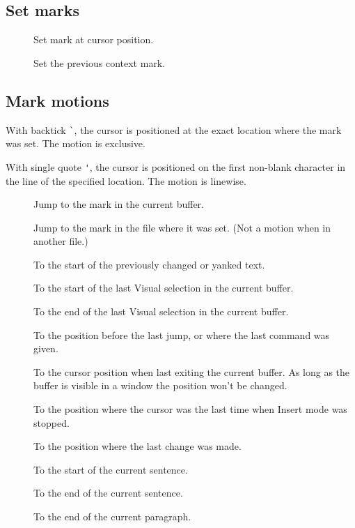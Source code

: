 \documentclass{article}
\newcommand{\syntax}[1]{\PVerb{#1}}
\begin{document}
\subsection{Set marks}
\begin{description}
  \item[\syntax{m{a-zA-Z}}] Set mark at cursor position. 
  \item[\syntax{m', m`}] Set the previous context mark.
\end{description}
\subsection{Mark motions}
    With backtick \verb|`|, the cursor is positioned at the exact location where the mark was set. The motion is exclusive.

    With single quote \verb|'|, the cursor is positioned on the first non-blank character in the line of the specified location. The motion is linewise.
\begin{description}
  \item[] Jump to the mark in the current buffer.
  \item[\syntax{'{A-Z0-9},`{A-Z0-9}}] Jump to the mark in the file where it was set. (Not a motion when in another file.) 
  \item[\PVerb{'[, `[}] To the start of the previously changed or yanked text.
  \item[] To the start of the last Visual selection in the current buffer.
  \item[] To the end of the last Visual selection in the current buffer.
  \item[] To the position before the last jump, or where the last  command was given.
  \item[] To the cursor position when last exiting the current buffer. As long as the buffer is visible in a window the position won't be changed. 
  \item[] To the position where the cursor was the last time when Insert mode was stopped.
  \item[] To the position where the last change was made.
  \item[] To the start of the current sentence.
  \item[] To the end of the current sentence.
  \item[\PVerb{'{, `{}] To the start of the current paragraph.
  \item[\PVerb{'}, `}}] To the end of the current paragraph.
\end{description}
\end{document}
